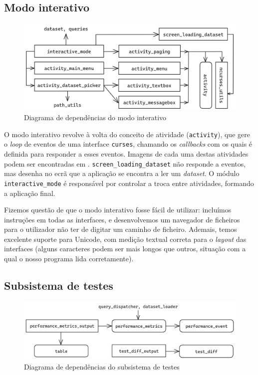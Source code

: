 \documentclass[12pt, a4paper]{article}
\begin{document}
\subsection{Modo interativo}
\label{sec:interactive-mode}

\begin{figure}[ht]
    \centering
    \includegraphics[scale=0.17]{res-fase2/interactive.png}
    \caption{Diagrama de dependências do modo interativo}
    \label{fig:interactive}
\end{figure}

O modo interativo revolve à volta do conceito de atividade (\texttt{activity}), que gere o
\emph{loop} de eventos de uma interface \texttt{curses}, chamando os \emph{callbacks} com os quais
é definida para responder a esses eventos. Imagens de cada uma destas atividades podem ser
encontradas em . \texttt{screen\_loading\_dataset} não responde
a eventos, mas desenha no ecrã que a aplicação se encontra a ler um \emph{dataset}. O módulo
\texttt{interactive\_mode} é responsável por controlar a troca entre atividades, formando a
aplicação final.

Fizemos questão de que o modo interativo fosse fácil de utilizar: incluímos instruções em todas as
interfaces, e desenvolvemos um navegador de ficheiros para o utilizador não ter de digitar um
caminho de ficheiro. Ademais, temos excelente suporte para Unicode, com medição textual correta para
o \emph{layout} das interfaces (alguns caracteres podem ser mais longos que outros, situação
com a qual o nosso programa lida corretamente).

\subsection{Subsistema de testes}
\label{sec:interactive-mode}

\begin{figure}[ht]
    \centering
    \includegraphics[scale=0.15]{res-fase2/testing.png}
    \caption{Diagrama de dependências do subsistema de testes}
    \label{fig:testing}
\end{figure}
\end{document}
